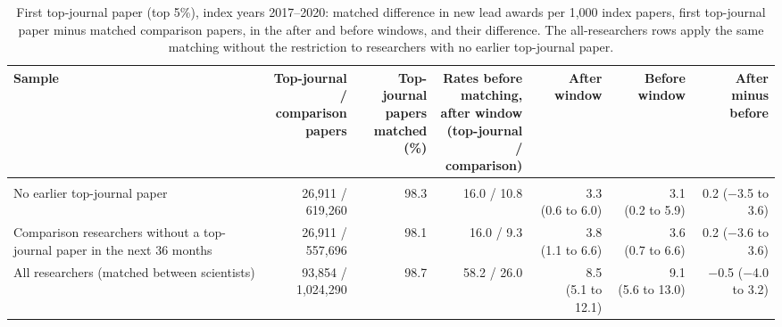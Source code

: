 \begin{table}[H]
\centering\small
\caption{First top-journal paper (top 5\%), index years 2017--2020: matched difference in new lead awards per 1,000 index papers, first top-journal paper minus matched comparison papers, in the after and before windows, and their difference. The all-researchers rows apply the same matching without the restriction to researchers with no earlier top-journal paper.}\label{tab:s_first}
\footnotesize
\begin{tabularx}{\linewidth}{>{\raggedright\arraybackslash}Xrrrrrr}
\toprule
Sample & \makecell[rb]{Top-journal /\\comparison\\papers} & \makecell[rb]{Top-journal\\papers\\matched (\%)} & \makecell[rb]{Rates before\\matching,\\after window\\(top-journal\\/ comparison)} & After window & Before window & \makecell[rb]{After minus\\before} \\
\midrule
\multicolumn{7}{>{\raggedright\arraybackslash}p{\dimexpr\textwidth-2\tabcolsep\relax}}{\textit{Against all other journals}} \\
No earlier top-journal paper & \makecell[rt]{26,911 /\\619,260} & 98.3 & 16.0 / 10.8 & \makecell[rt]{3.3\\(0.6 to 6.0)} & \makecell[rt]{3.1\\(0.2 to 5.9)} & \makecell[rt]{0.2\\($-$3.5 to 3.6)} \\
Comparison researchers without a top-journal paper in the next 36 months & \makecell[rt]{26,911 /\\557,696} & 98.1 & 16.0 / 9.3 & \makecell[rt]{3.8\\(1.1 to 6.6)} & \makecell[rt]{3.6\\(0.7 to 6.6)} & \makecell[rt]{0.2\\($-$3.6 to 3.6)} \\
All researchers (matched between scientists) & \makecell[rt]{93,854 /\\1,024,290} & 98.7 & 58.2 / 26.0 & \makecell[rt]{8.5\\(5.1 to 12.1)} & \makecell[rt]{9.1\\(5.6 to 13.0)} & \makecell[rt]{$-$0.5\\($-$4.0 to 3.2)} \\

\end{tabularx}
\end{table}
